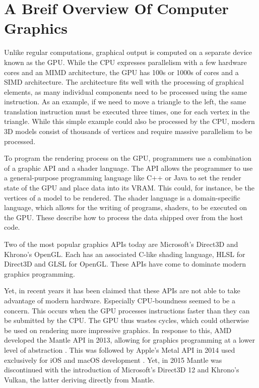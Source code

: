 \section{A Breif Overview Of Computer Graphics}
Unlike regular computations, graphical output is computed on a separate device known as the \gls{GPU}.
While the \gls{CPU} expresses parallelism with a few hardware cores and an \gls{MIMD} architecture, the \gls{GPU} has 100s or 1000s of cores and a \gls{SIMD} architecture\cite{intro_to_gpu_arch}.
The architecture fits well with the processing of graphical elements, as many individual components need to be processed using the same instruction.
As an example, if we need to move a triangle to the left, the same translation instruction must be executed three times, one for each vertex in the triangle.
While this simple example could also be processed by the \gls{CPU}, modern 3D models consist of thousands of vertices and require massive parallelism to be processed. 


To program the rendering process on the \gls{GPU}, programmers use a combination of a graphic \gls{API} and a shader language.
The \gls{API} allows the programmer to use a general-purpose programming language like C++ or Java to set the render state of the \gls{GPU} and place data into its VRAM.
This could, for instance, be the vertices of a model to be rendered. 
The shader language is a domain-specific language, which allows for the writing of programs, shaders, to be executed on the \gls{GPU}.
These describe how to process the data shipped over from the host code. 


Two of the most popular graphics \glspl{API} today are Microsoft’s Direct3D\cite{wikipedia????directx} and Khrono’s OpenGL\cite{wikipedia????opengl}.
Each has an associated C-like shading language, \gls{HLSL} for Direct3D and \gls{GLSL} for OpenGL.
These \glspl{API} have come to dominate modern graphics programming. 


Yet, in recent years it has been claimed that these \glspl{API} are not able to take advantage of modern hardware.
Especially \gls{CPU}-boundness seemed to be a concern.
This occurs when the \gls{GPU} processes instructions faster than they can be submitted by the \gls{CPU}.
The \gls{GPU} thus wastes cycles, which could otherwise be used on rendering more impressive graphics. 
In response to this, AMD developed the Mantle \gls{API} in 2013, allowing for graphics programming at a lower level of abstraction \cite{wikiMantle}. 
This was followed by Apple’s Metal \gls{API} in 2014 used exclusively for iOS and macOS development \cite{wikiMetal}. 
Yet, in 2015 Mantle was discontinued with the introduction of Microsoft’s Direct3D 12\cite{wikipedia????directx} and Khrono’s Vulkan\cite{wikiVulkan}, the latter deriving directly from Mantle. 


